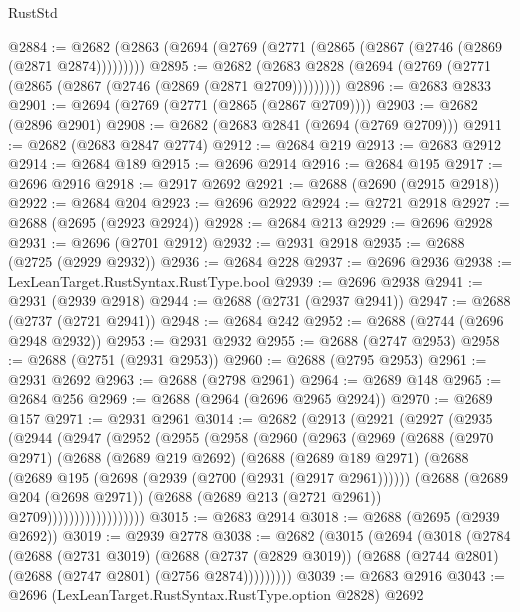 \begin{lexlean}{RustStd}
\begin{coremodule}
@2884 := @2682 (@2863 (@2694 (@2769 (@2771 (@2865 (@2867 (@2746 (@2869 (@2871 @2874)))))))))
@2895 := @2682 (@2683 @2828 (@2694 (@2769 (@2771 (@2865 (@2867 (@2746 (@2869 (@2871 @2709)))))))))
@2896 := @2683 @2833
@2901 := @2694 (@2769 (@2771 (@2865 (@2867 @2709))))
@2903 := @2682 (@2896 @2901)
@2908 := @2682 (@2683 @2841 (@2694 (@2769 @2709)))
@2911 := @2682 (@2683 @2847 @2774)
@2912 := @2684 @219
@2913 := @2683 @2912
@2914 := @2684 @189
@2915 := @2696 @2914
@2916 := @2684 @195
@2917 := @2696 @2916
@2918 := @2917 @2692
@2921 := @2688 (@2690 (@2915 @2918))
@2922 := @2684 @204
@2923 := @2696 @2922
@2924 := @2721 @2918
@2927 := @2688 (@2695 (@2923 @2924))
@2928 := @2684 @213
@2929 := @2696 @2928
@2931 := @2696 (@2701 @2912)
@2932 := @2931 @2918
@2935 := @2688 (@2725 (@2929 @2932))
@2936 := @2684 @228
@2937 := @2696 @2936
@2938 := LexLeanTarget.RustSyntax.RustType.bool
@2939 := @2696 @2938
@2941 := @2931 (@2939 @2918)
@2944 := @2688 (@2731 (@2937 @2941))
@2947 := @2688 (@2737 (@2721 @2941))
@2948 := @2684 @242
@2952 := @2688 (@2744 (@2696 @2948 @2932))
@2953 := @2931 @2932
@2955 := @2688 (@2747 @2953)
@2958 := @2688 (@2751 (@2931 @2953))
@2960 := @2688 (@2795 @2953)
@2961 := @2931 @2692
@2963 := @2688 (@2798 @2961)
@2964 := @2689 @148
@2965 := @2684 @256
@2969 := @2688 (@2964 (@2696 @2965 @2924))
@2970 := @2689 @157
@2971 := @2931 @2961
@3014 := @2682
    (@2913
      (@2921
        (@2927
          (@2935
            (@2944
              (@2947
                (@2952
                  (@2955
                    (@2958
                      (@2960
                        (@2963
                          (@2969
                            (@2688
                              (@2970 @2971)
                              (@2688
                                (@2689 @219 @2692)
                                (@2688
                                  (@2689 @189 @2971)
                                  (@2688
                                    (@2689 @195 (@2698 (@2939 (@2700 (@2931 (@2917 @2961))))))
                                    (@2688
                                      (@2689 @204 (@2698 @2971))
                                      (@2688 (@2689 @213 (@2721 @2961)) @2709))))))))))))))))))
@3015 := @2683 @2914
@3018 := @2688 (@2695 (@2939 @2692))
@3019 := @2939 @2778
@3038 := @2682
    (@3015
      (@2694
        (@3018
          (@2784
            (@2688
              (@2731 @3019)
              (@2688
                (@2737 (@2829 @3019))
                (@2688 (@2744 @2801) (@2688 (@2747 @2801) (@2756 @2874)))))))))
@3039 := @2683 @2916
@3043 := @2696 (LexLeanTarget.RustSyntax.RustType.option @2828) @2692

\end{coremodule}
\end{lexlean}
